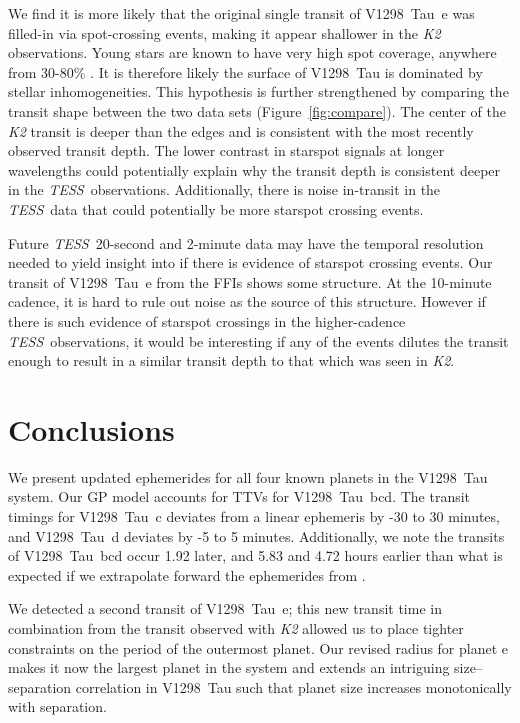 \documentclass[linenumbers,twocolumn]{aastex631}
\newcommand{\tess}{\textit{TESS}}
\newcommand{\sname}{V1298~Tau\xspace}
\newcommand{\planetc}{V1298~Tau~c\xspace}
\newcommand{\planetd}{V1298~Tau~d\xspace}
\newcommand{\planete}{V1298~Tau~e\xspace}
\newcommand{\planetknown}{V1298~Tau~bcd\xspace}
\begin{document}
We find it is more likely that the original single transit of \planete was filled-in via spot-crossing events, making it appear shallower in the \textit{K2} observations. Young stars are known to have very high spot coverage, anywhere from 30-80\% \citep[][]{grankin99, gully17, feinstein20}. It is therefore likely the surface of \sname is dominated by stellar inhomogeneities. This hypothesis is further strengthened by comparing the transit shape between the two data sets (Figure~\ref{fig:compare}). The center of the \textit{K2} transit is deeper than the edges and is consistent with the most recently observed transit depth. The lower contrast in starspot signals at longer wavelengths could potentially explain why the transit depth is consistent deeper in the \tess\ observations. Additionally, there is noise in-transit in the \tess\ data that could potentially be more starspot crossing events.


Future \tess\ 20-second and 2-minute data may have the temporal resolution needed to yield insight into if there is evidence of starspot crossing events. Our transit of \planete from the FFIs shows some structure. At the 10-minute cadence, it is hard to rule out noise as the source of this structure. However if there is such evidence of starspot crossings in the higher-cadence \tess\ observations, it would be interesting if any of the events dilutes the transit enough to result in a similar transit depth to that which was seen in \textit{K2}. 

\section{Conclusions} \label{sec:conclusions}

We present updated ephemerides for all four known planets in the \sname system. Our GP model accounts for TTVs for \planetknown. The transit timings for \planetc deviates from a linear ephemeris by -30 to 30 minutes, and \planetd deviates by -5 to 5 minutes. Additionally, we note the transits of \planetknown occur 1.92 later, and 5.83 and 4.72 hours earlier than what is expected if we extrapolate forward the ephemerides from \cite{David2019b}.

We detected a second transit of \planete; this new transit time in combination from the transit observed with \textit{K2} allowed us to place tighter constraints on the period of the outermost planet. Our revised radius for planet e makes it now the largest planet in the system and extends an intriguing size--separation correlation in \sname such that planet size increases monotonically with separation.
\end{document}
